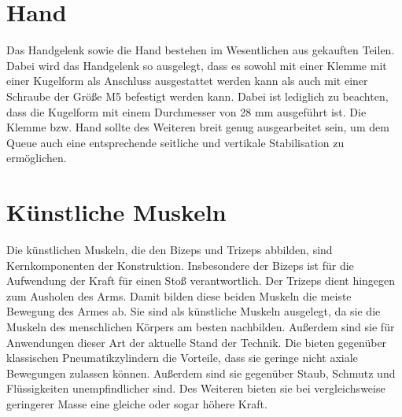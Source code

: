	\section{Hand}
		Das Handgelenk sowie die Hand bestehen im Wesentlichen aus gekauften Teilen.
		Dabei wird das Handgelenk so ausgelegt, dass es sowohl mit einer Klemme mit einer Kugelform als Anschluss ausgestattet werden kann als auch mit einer Schraube der Größe M5 befestigt werden kann.
		Dabei ist lediglich zu beachten, dass die Kugelform mit einem Durchmesser von 28 mm ausgeführt ist.
		Die Klemme bzw. Hand sollte des Weiteren breit genug ausgearbeitet sein, um dem Queue auch eine entsprechende seitliche und vertikale Stabilisation zu ermöglichen.
	
	\section{Künstliche Muskeln}
		Die künstlichen Muskeln, die den Bizeps und Trizeps abbilden, sind Kernkomponenten der Konstruktion. 
		Insbesondere der Bizeps ist für die Aufwendung der Kraft für einen Stoß verantwortlich. 
		Der Trizeps dient hingegen zum Ausholen des Arms.
		Damit bilden diese beiden Muskeln die meiste Bewegung des Armes ab.
		Sie sind als künstliche Muskeln ausgelegt, da sie die Muskeln des menschlichen Körpers am besten nachbilden. 
		Außerdem sind sie für Anwendungen dieser Art der aktuelle Stand der Technik. 
		Die bieten gegenüber klassischen Pneumatikzylindern die Vorteile, dass sie geringe nicht axiale Bewegungen zulassen können. 
		Außerdem sind sie gegenüber Staub, Schmutz und Flüssigkeiten unempfindlicher sind. 
		Des Weiteren bieten sie bei vergleichsweise geringerer Masse eine gleiche oder sogar höhere Kraft.  
